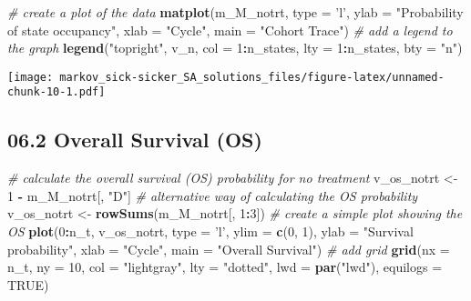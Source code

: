\documentclass[
]{article}
\newenvironment{Shaded}{\begin{snugshade}}{\end{snugshade}}
\newcommand{\CommentTok}[1]{\textcolor[rgb]{0.56,0.35,0.01}{\textit{#1}}}
\newcommand{\DataTypeTok}[1]{\textcolor[rgb]{0.13,0.29,0.53}{#1}}
\newcommand{\DecValTok}[1]{\textcolor[rgb]{0.00,0.00,0.81}{#1}}
\newcommand{\KeywordTok}[1]{\textcolor[rgb]{0.13,0.29,0.53}{\textbf{#1}}}
\newcommand{\NormalTok}[1]{#1}
\newcommand{\OperatorTok}[1]{\textcolor[rgb]{0.81,0.36,0.00}{\textbf{#1}}}
\newcommand{\OtherTok}[1]{\textcolor[rgb]{0.56,0.35,0.01}{#1}}
\newcommand{\StringTok}[1]{\textcolor[rgb]{0.31,0.60,0.02}{#1}}
\begin{document}
\begin{Shaded}
\begin{Highlighting}[]
\CommentTok{# create a plot of the data}
\KeywordTok{matplot}\NormalTok{(m_M_notrt, }\DataTypeTok{type =} \StringTok{'l'}\NormalTok{, }
        \DataTypeTok{ylab =} \StringTok{"Probability of state occupancy"}\NormalTok{,}
        \DataTypeTok{xlab =} \StringTok{"Cycle"}\NormalTok{,}
        \DataTypeTok{main =} \StringTok{"Cohort Trace"}\NormalTok{)             }
\CommentTok{# add a legend to the graph}
\KeywordTok{legend}\NormalTok{(}\StringTok{"topright"}\NormalTok{, v_n, }\DataTypeTok{col =} \DecValTok{1}\OperatorTok{:}\NormalTok{n_states, }\DataTypeTok{lty =} \DecValTok{1}\OperatorTok{:}\NormalTok{n_states, }\DataTypeTok{bty =} \StringTok{"n"}\NormalTok{) }
\end{Highlighting}
\end{Shaded}

\texttt{[image: markov\_sick-sicker\_SA\_solutions\_files/figure-latex/unnamed-chunk-10-1.pdf]}

\hypertarget{overall-survival-os}{%
\subsection{06.2 Overall Survival (OS)}\label{overall-survival-os}}

\begin{Shaded}
\begin{Highlighting}[]
\CommentTok{# calculate the overall survival (OS) probability for no treatment}
\NormalTok{v_os_notrt <-}\StringTok{ }\DecValTok{1} \OperatorTok{-}\StringTok{ }\NormalTok{m_M_notrt[, }\StringTok{"D"}\NormalTok{]    }
\CommentTok{# alternative way of calculating the OS probability   }
\NormalTok{v_os_notrt <-}\StringTok{ }\KeywordTok{rowSums}\NormalTok{(m_M_notrt[, }\DecValTok{1}\OperatorTok{:}\DecValTok{3}\NormalTok{])  }
\CommentTok{# create a simple plot showing the OS}
\KeywordTok{plot}\NormalTok{(}\DecValTok{0}\OperatorTok{:}\NormalTok{n_t, v_os_notrt, }\DataTypeTok{type =} \StringTok{'l'}\NormalTok{, }
     \DataTypeTok{ylim =} \KeywordTok{c}\NormalTok{(}\DecValTok{0}\NormalTok{, }\DecValTok{1}\NormalTok{),}
     \DataTypeTok{ylab =} \StringTok{"Survival probability"}\NormalTok{,}
     \DataTypeTok{xlab =} \StringTok{"Cycle"}\NormalTok{,}
     \DataTypeTok{main =} \StringTok{"Overall Survival"}\NormalTok{)          }
\CommentTok{# add grid }
\KeywordTok{grid}\NormalTok{(}\DataTypeTok{nx =}\NormalTok{ n_t, }\DataTypeTok{ny =} \DecValTok{10}\NormalTok{, }\DataTypeTok{col =} \StringTok{"lightgray"}\NormalTok{, }\DataTypeTok{lty =} \StringTok{"dotted"}\NormalTok{, }\DataTypeTok{lwd =} \KeywordTok{par}\NormalTok{(}\StringTok{"lwd"}\NormalTok{), }
     \DataTypeTok{equilogs =} \OtherTok{TRUE}\NormalTok{) }
\end{Highlighting}
\end{Shaded}
\end{document}
